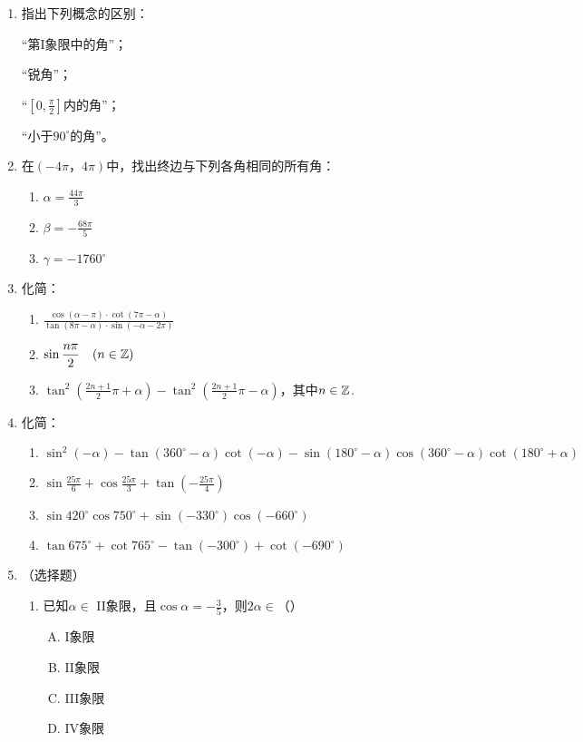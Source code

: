 \begin{enumerate}
\item 指出下列概念的区别：    
\begin{multicols}{2}
    “第I象限中的角”；

    “锐角”；

    “$\left[0,\frac{\pi}{2}\right]$内的角”；

    “小于$90^{\circ}$的角”。


\end{multicols}

\item     在$(-4\pi，4\pi)$中，找出终边与下列各角相同的所有角：
\begin{multicols}{3}
\begin{enumerate}[(1)]
    \item $\alpha=\frac{44\pi}{3}$
    \item $\beta=-\frac{68\pi}{5}$
    \item $\gamma=-1760^{\circ}$
\end{enumerate}
\end{multicols}

\item 化简：
\begin{enumerate}[(1)]
    \item $\frac{\cos(\alpha-\pi)\cdot \cot (7\pi-\alpha)}{\tan(8\pi-\alpha)\cdot \sin(-\alpha-2\pi)}$
    \item $\sin\dfrac{n\pi}{2}\quad (n\in\mathbb{Z})$
    \item $\tan^2\left(\frac{2n+1}{2}\pi+\alpha\right)-\tan^2\left(\frac{2n+1}{2}\pi-\alpha\right)$，其中$n\in\mathbb{Z}$.
\end{enumerate}

\item 化简：
\begin{enumerate}[(1)]
\item $\sin^2(-\alpha)-\tan(360^{\circ}-\alpha)\cot(-\alpha)-\sin(180^{\circ}-\alpha)\cos(360^{\circ}-\alpha)\cot(180^{\circ}+\alpha)$
\item $\sin\frac{25\pi}{6}+\cos\frac{25\pi}{3}+\tan\left(-\frac{25\pi}{4}\right)$
\item $\sin420^{\circ}\cos750^{\circ}+\sin(-330^{\circ})\cos(-660^{\circ})$
\item $\tan675^{\circ}+\cot765^{\circ}-\tan(-300^{\circ})+\cot(-690^{\circ})$
\end{enumerate}

\item （选择题）
\begin{enumerate}[(1)]
    \item 已知$\alpha\in $ II象限，且$\cos\alpha=-\frac{3}{5}$，则$2\alpha\in$（\qquad）
\begin{multicols}{4}
\begin{enumerate}[(A)]
    \item I象限
    \item II象限
    \item III象限
    \item IV象限
\end{enumerate}
\end{multicols}


\end{enumerate}
\end{enumerate}
